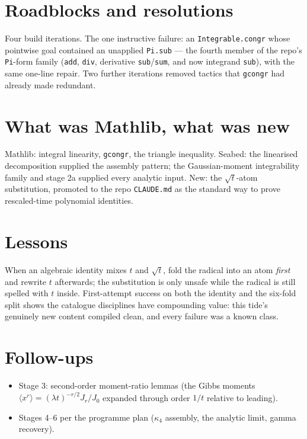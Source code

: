 \documentclass[11pt]{article}
\begin{document}
\section{Roadblocks and resolutions}

Four build iterations. The one instructive failure: an
\texttt{Integrable.congr} whose pointwise goal contained an unapplied
\texttt{Pi.sub} --- the fourth member of the repo's \texttt{Pi}-form
family (\texttt{add}, \texttt{div}, derivative \texttt{sub}/\texttt{sum},
and now integrand \texttt{sub}), with the same one-line repair. Two
further iterations removed tactics that \texttt{gcongr} had already
made redundant.

\section{What was Mathlib, what was new}

Mathlib: integral linearity, \texttt{gcongr}, the triangle inequality.
Seabed: the linearised decomposition supplied the assembly pattern; the
Gaussian-moment integrability family and stage 2a supplied every
analytic input. New: the $\sqrt t$-atom substitution, promoted to the
repo \texttt{CLAUDE.md} as the standard way to prove rescaled-time
polynomial identities.

\section{Lessons}

When an algebraic identity mixes $t$ and $\sqrt t$, fold the radical
into an atom \emph{first} and rewrite $t$ afterwards; the substitution
is only unsafe while the radical is still spelled with $t$ inside.
First-attempt success on both the identity and the six-fold split shows
the catalogue disciplines have compounding value: this tide's genuinely
new content compiled clean, and every failure was a known class.

\section{Follow-ups}

\begin{itemize}
\item Stage 3: second-order moment-ratio lemmas (the Gibbs moments
$\langle x^r \rangle = (\lambda t)^{-r/2} J_r/J_0$ expanded through
order $1/t$ relative to leading).
\item Stages 4--6 per the programme plan ($\kappa_4$ assembly, the
analytic limit, gamma recovery).
\end{itemize}
\end{document}
